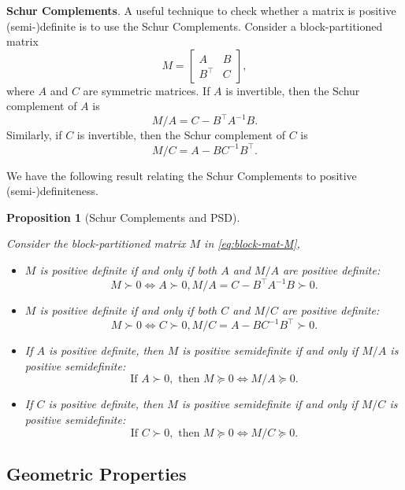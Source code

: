 \documentclass[
]{book}
\newtheorem{proposition}{Proposition}[chapter]
\theoremstyle{definition}
\theoremstyle{definition}
\theoremstyle{definition}
\theoremstyle{definition}
\theoremstyle{remark}
\begin{document}
\textbf{Schur Complements}. A useful technique to check whether a matrix is positive (semi-)definite is to use the Schur Complements. Consider a block-partitioned matrix
\begin{equation}
M = \begin{bmatrix} A & B \\ B^\top& C \end{bmatrix},
\label{eq:block-mat-M}
\end{equation}
where \(A\) and \(C\) are symmetric matrices.
If \(A\) is invertible, then the Schur complement of \(A\) is
\[
M / A = C - B^\top A^{-1}B.
\]
Similarly, if \(C\) is invertible, then the Schur complement of \(C\) is
\[
M / C = A - B C^{-1}B^\top.
\]

We have the following result relating the Schur Complements to positive (semi-)definiteness.

\begin{proposition}[Schur Complements and PSD]
\protect\hypertarget{prp:SchurPSD}{}\label{prp:SchurPSD}

Consider the block-partitioned matrix \(M\) in \eqref{eq:block-mat-M},

\begin{itemize}
\item
  \(M\) is positive definite if and only if both \(A\) and \(M/A\) are positive definite:
  \[
  M \succ 0 \Leftrightarrow A \succ 0, M/A = C - B^\top A^{-1}B \succ 0.
  \]
\item
  \(M\) is positive definite if and only if both \(C\) and \(M/C\) are positive definite:
  \[
  M \succ 0 \Leftrightarrow C \succ 0, M/C = A - B C^{-1}B^\top\succ 0.
  \]
\item
  If \(A\) is positive definite, then \(M\) is positive semidefinite if and only if \(M/A\) is positive semidefinite:
  \[
  \text{If } A \succ 0, \text{ then } M \succeq 0 \Leftrightarrow M / A \succeq 0.
  \]
\item
  If \(C\) is positive definite, then \(M\) is positive semidefinite if and only if \(M/C\) is positive semidefinite:
  \[
  \text{If } C \succ 0, \text{ then } M \succeq 0 \Leftrightarrow M / C \succeq 0.
  \]
\end{itemize}

\end{proposition}

\hypertarget{geometric-properties}{%
\subsection{Geometric Properties}\label{geometric-properties}}
\end{document}
